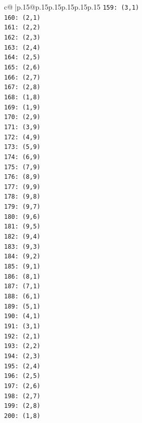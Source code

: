 \documentclass{article}
\begin{document}
{\begin{supertabular}{c@{$\;$}|p{.15\linewidth}@{}p{.15\linewidth}p{.15\linewidth}p{.15\linewidth}p{.15\linewidth}p{.15\linewidth}}
{{{\texttt{159: (3,1)} \\
\texttt{160: (2,1)} \\
\texttt{161: (2,2)} \\
\texttt{162: (2,3)} \\
\texttt{163: (2,4)} \\
\texttt{164: (2,5)} \\
\texttt{165: (2,6)} \\
\texttt{166: (2,7)} \\
\texttt{167: (2,8)} \\
\texttt{168: (1,8)} \\
\texttt{169: (1,9)} \\
\texttt{170: (2,9)} \\
\texttt{171: (3,9)} \\
\texttt{172: (4,9)} \\
\texttt{173: (5,9)} \\
\texttt{174: (6,9)} \\
\texttt{175: (7,9)} \\
\texttt{176: (8,9)} \\
\texttt{177: (9,9)} \\
\texttt{178: (9,8)} \\
\texttt{179: (9,7)} \\
\texttt{180: (9,6)} \\
\texttt{181: (9,5)} \\
\texttt{182: (9,4)} \\
\texttt{183: (9,3)} \\
\texttt{184: (9,2)} \\
\texttt{185: (9,1)} \\
\texttt{186: (8,1)} \\
\texttt{187: (7,1)} \\
\texttt{188: (6,1)} \\
\texttt{189: (5,1)} \\
\texttt{190: (4,1)} \\
\texttt{191: (3,1)} \\
\texttt{192: (2,1)} \\
\texttt{193: (2,2)} \\
\texttt{194: (2,3)} \\
\texttt{195: (2,4)} \\
\texttt{196: (2,5)} \\
\texttt{197: (2,6)} \\
\texttt{198: (2,7)} \\
\texttt{199: (2,8)} \\
\texttt{200: (1,8)} \\
}}}
\end{supertabular}}
\end{document}
